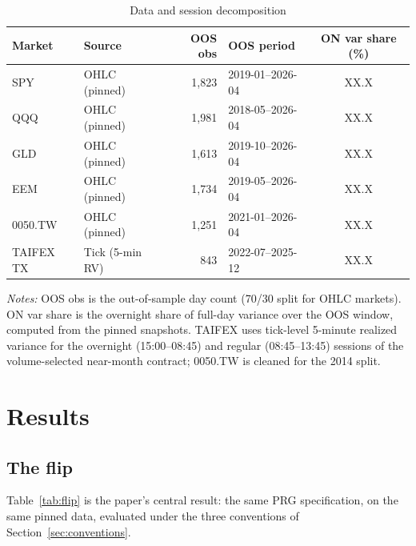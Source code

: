 \documentclass[11pt,a4paper]{article}
\begin{document}
\begin{table}[htbp]
\centering
\caption{Data and session decomposition}
\label{tab:data}
\small
\begin{tabular}{llrlc}
\toprule
Market & Source & OOS obs & OOS period & ON var share (\%) \\
\midrule
SPY        & OHLC (pinned)   & 1{,}823 & 2019-01--2026-04 & XX.X \\
QQQ        & OHLC (pinned)   & 1{,}981 & 2018-05--2026-04 & XX.X \\
GLD        & OHLC (pinned)   & 1{,}613 & 2019-10--2026-04 & XX.X \\
EEM        & OHLC (pinned)   & 1{,}734 & 2019-05--2026-04 & XX.X \\
0050.TW    & OHLC (pinned)   & 1{,}251 & 2021-01--2026-04 & XX.X \\
TAIFEX TX  & Tick (5-min RV) & 843     & 2022-07--2025-12 & XX.X \\
\bottomrule
\end{tabular}
\begin{flushleft}
\footnotesize
\emph{Notes:} OOS obs is the out-of-sample day count (70/30 split for OHLC markets). ON var share is the overnight share of full-day variance over the OOS window, computed from the pinned snapshots. TAIFEX uses tick-level 5-minute realized variance for the overnight (15:00--08:45) and regular (08:45--13:45) sessions of the volume-selected near-month contract; 0050.TW is cleaned for the 2014 split.
\end{flushleft}
\end{table}

\section{Results}
\label{sec:results}

\subsection{The flip}

Table~\ref{tab:flip} is the paper's central result: the same PRG specification, on the same pinned data, evaluated under the three conventions of Section~\ref{sec:conventions}.
\end{document}
